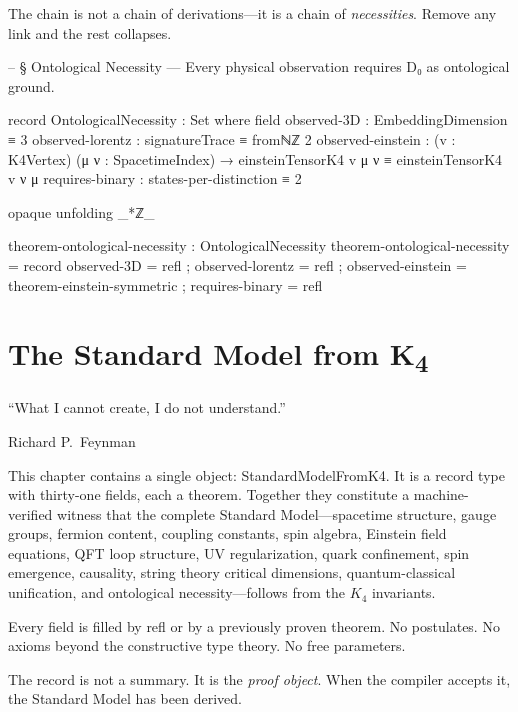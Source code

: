 \documentclass[11pt,a4paper]{book}
\def\texttt#1{#1}%
\begin{document}
The chain is not a chain of derivations---it is a chain of \emph{necessities}. Remove any link and the rest collapses.

\begin{code}
-- § Ontological Necessity — Every physical observation requires D₀ as ontological ground.

record OntologicalNecessity : Set where
  field
    observed-3D       : EmbeddingDimension ≡ 3
    observed-lorentz  : signatureTrace ≡ fromℕℤ 2
    observed-einstein : (v : K4Vertex) (μ ν : SpacetimeIndex) →
                        einsteinTensorK4 v μ ν ≡ einsteinTensorK4 v ν μ
    requires-binary   : states-per-distinction ≡ 2

opaque
  unfolding _*ℤ_

  theorem-ontological-necessity : OntologicalNecessity
  theorem-ontological-necessity = record
    { observed-3D       = refl
    ; observed-lorentz  = refl
    ; observed-einstein = theorem-einstein-symmetric
    ; requires-binary   = refl }
\end{code}

\chapter{The Standard Model from K\textsubscript{4}}
\label{ch:master-record}

\epigraph{``What I cannot create, I do not understand.''}{Richard P.~Feynman}

This chapter contains a single object: \texttt{StandardModelFromK4}. It is a record type with thirty-one fields, each a theorem. Together they constitute a machine-verified witness that the complete Standard Model---spacetime structure, gauge groups, fermion content, coupling constants, spin algebra, Einstein field equations, QFT loop structure, UV regularization, quark confinement, spin emergence, causality, string theory critical dimensions, quantum-classical unification, and ontological necessity---follows from the $K_4$ invariants.

Every field is filled by \texttt{refl} or by a previously proven theorem. No postulates. No axioms beyond the constructive type theory. No free parameters.

The record is not a summary. It is the \emph{proof object}. When the compiler accepts it, the Standard Model has been derived.
\end{document}
